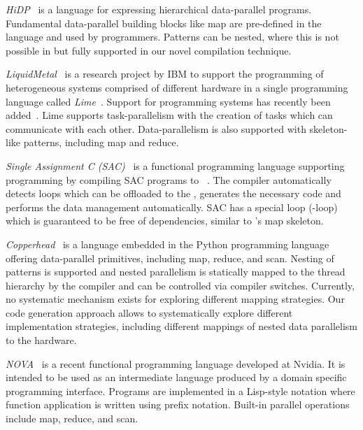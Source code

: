 \bigskip

\emph{{\small HiDP}}~\cite{ZhangM13} is a language for expressing hierarchical data-parallel programs.
Fundamental data-parallel building blocks like map are pre-defined in the language and used by programmers.
Patterns can be nested, where this is not possible in \SkelCL but fully supported in our novel compilation technique.

\bigskip

\emph{LiquidMetal}~\cite{HuangHBR08} is a research project by IBM to support the programming of heterogeneous systems comprised of different hardware in a single programming language called \emph{Lime}~\cite{AuerbachBCR10}.
Support for programming \GPU systems has recently been added~\cite{DubachCRBF12}.
Lime supports task-parallelism with the creation of tasks which can communicate with each other.
Data-parallelism is also supported with skeleton-like patterns, including map and reduce.

\bigskip

\emph{Single Assignment C (SAC)}~\cite{GrelckS06} is a functional programming language supporting \GPU programming by compiling SAC programs to \CUDA~\cite{GuoTS11}.
The compiler automatically detects loops which can be offloaded to the \GPU, generates the necessary \CUDA code and performs the data management automatically.
SAC has a special loop (-loop) which is guaranteed to be free of dependencies, similar to \SkelCL's map skeleton.

\bigskip

\emph{Copperhead}~\cite{CatanzaroGK11} is a \GPU language embedded in the Python programming language offering data-parallel primitives, including map, reduce, and scan.
Nesting of patterns is supported and nested parallelism is statically mapped to the \GPU thread hierarchy by the compiler and can be controlled via compiler switches.
Currently, no systematic mechanism exists for exploring different mapping strategies.
Our code generation approach allows to systematically explore different implementation strategies, including different mappings of nested data parallelism to the hardware.

\bigskip

\emph{{\small NOVA}}~\cite{CollinsGGLS14} is a recent functional \GPU programming language developed at Nvidia.
It is intended to be used as an intermediate language produced by a domain specific programming interface.
Programs are implemented in a Lisp-style notation where function application is written using prefix notation.
Built-in parallel operations include map, reduce, and scan.

